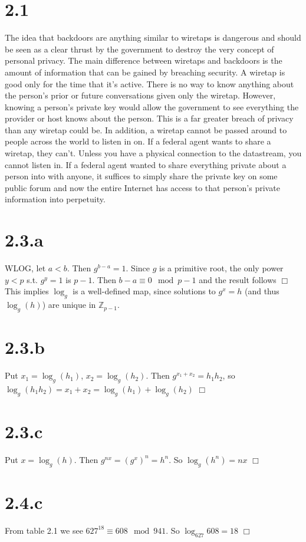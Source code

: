 \documentclass{article}
\begin{document}
\section*{2.1}
The idea that backdoors are anything similar to wiretaps is dangerous and should be seen as a clear thrust by the government to destroy the very concept of personal privacy. The main difference between wiretaps and backdoors is the amount of information that can be gained by breaching security. A wiretap is good only for the time that it's active. There is no way to know anything about the person's prior or future conversations given only the wiretap. However, knowing a person's private key would allow the government to see everything the provider or host knows about the person. This is a far greater breach of privacy than any wiretap could be. In addition, a wiretap cannot be passed around to people across the world to listen in on. If a federal agent wants to share a wiretap, they can't. Unless you have a physical connection to the datastream, you cannot listen in. If a federal agent wanted to share everything private about a person into with anyone, it suffices to simply share the private key on some public forum and now the entire Internet has access to that person's private information into perpetuity.

\section*{2.3.a}
WLOG, let $a < b$. Then $g^{b-a} = 1$. Since $g$ is a primitive root, the only power $y < p$ s.t. $g^y = 1$ is $p-1$. Then $b - a \equiv 0 \mod p-1$ and the result follows $\Box$\\
This implies $\log_g$ is a well-defined map, since solutions to $g^x = h$ (and thus $\log_g(h)$) are unique in $\mathbb{Z}_{p-1}$.

\section*{2.3.b}
Put $x_1 = \log_g(h_1)$, $x_2 = \log_g(h_2)$. Then $g^{x_1+x_2} = h_1h_2$, so $\log_g(h_1h_2) = x_1 + x_2 = \log_g(h_1) + \log_g(h_2)$ $\Box$

\section*{2.3.c}
Put $x = \log_g(h)$. Then $g^{nx} = (g^x)^n = h^n$. So $\log_g(h^n) = nx$ $\Box$

\section*{2.4.c}
From table 2.1 we see $627^{18} \equiv 608 \mod 941$. So $\log_{627}608 = 18$ $\Box$
\end{document}
